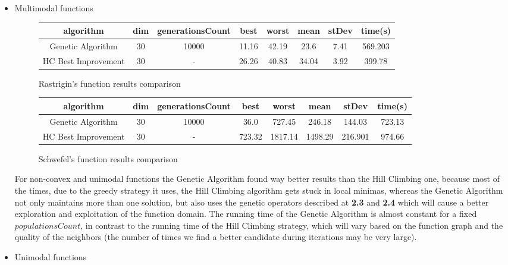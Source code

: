 \documentclass[a4paper]{article}
\begin{document}
	\begin{itemize}
		\item Multimodal functions
		
		\begin{figure}[!h]
			\centering
			\begin{tabular}{||c |  c | c | c | c | c | c | c ||}
				\hline
				algorithm & dim & generationsCount & best & worst & mean & stDev & time(s) \\ \hline \hline
				Genetic Algorithm & 30 & 10000 & 11.16 & 42.19 & 23.6 & 7.41 & 569.203 \\ \hline
				HC Best Improvement & 30 & - & 26.26 & 40.83 & 34.04 & 3.92 & 399.78 \\ \hline
			\end{tabular}
			\caption{Rastrigin's function results comparison}
		\end{figure}
	
		\begin{figure}[!h]
		\centering
		\begin{tabular}{||c |  c | c | c | c | c | c | c ||}
			\hline
			algorithm & dim & generationsCount & best & worst & mean & stDev & time(s) \\ \hline \hline
			Genetic Algorithm & 30 & 10000 & 36.0 & 727.45 & 246.18 & 144.03 & 723.13 \\ \hline
			HC Best Improvement & 30 & - & 723.32 & 1817.14 & 1498.29 & 216.901 & 974.66 \\ \hline
		\end{tabular}
		\caption{Schwefel’s function results comparison}
		\end{figure}
		
		For non-convex and unimodal functions the Genetic Algorithm found way better results than the Hill Climbing one, because most of the times, due to the greedy strategy it uses, the Hill Climbing algorithm gets stuck in local minimas, whereas the Genetic Algorithm not only maintains more than one solution, but also uses the genetic operators described at \textbf{2.3} and \textbf{2.4} which will cause a better exploration and exploitation of the function domain. The running time of the Genetic Algorithm is almost constant for a fixed $populationsCount$, in contrast to the running time of the Hill Climbing strategy, which will vary based on the function graph and the quality of the neighbors (the number of times we find a better candidate during iterations may be very large).
	
		\item Unimodal functions
		

\end{itemize}
\end{document}
